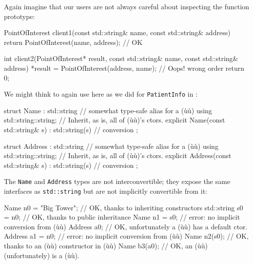 \noindent Again imagine that our users are not always careful about inspecting the
function prototype:

\begin{emcppslisting}[language=C++]
PointOfInterest client1(const std::string& name, const std::string& address)
{
    return PointOfInterest(name, address);  // OK
}

int client2(PointOfInterest*   result,                                          
            const std::string& name,                                            
            const std::string& address)
{
    *result = PointOfInterest(address, name);  // Oops! wrong order
    return 0;
}
\end{emcppslisting}
    
\noindent We might think to again use  here as we
did for \lstinline!PatientInfo! in : 

\begin{emcppslisting}[language=C++]
struct Name : std::string  // somewhat type-safe alias for a (ù{}ù)
{
    using std::string::string;  // Inherit, as is, all of (ù{}ù)'s ctors.
    explicit Name(const std::string& s) : std::string(s) { }  // conversion
};

struct Address : std::string  // somewhat type-safe alias for a (ù{}ù)
{
    using std::string::string;  // Inherit, as is, all of (ù{}ù)'s ctors.
    explicit Address(const std::string& s) : std::string(s) { }  // conversion
};
\end{emcppslisting}
    
\noindent The \lstinline!Name! and \lstinline!Address! types are not interconvertible; they expose the same interfaces as \lstinline!std::string! but are not
implicitly convertible from it:

\begin{emcppslisting}[language=C++]
Name n0 = "Big Tower";  // OK, thanks to inheriting constructors
std::string s0 = n0;    // OK, thanks to public inheritance
Name n1 = s0;           // error: no implicit conversion from (ù{}ù)
Address a0;             // OK, unfortunately a (ù{}ù) has a default ctor.
Address a1 = n0;        // error: no implicit conversion from (ù{}ù)
Name n2(s0);            // OK, thanks to an (ù{}ù) constructor in (ù{}ù)
Name b3(a0);            // OK, an (ù{}ù) (unfortunately) is a (ù{}ù).
\end{emcppslisting}
    
